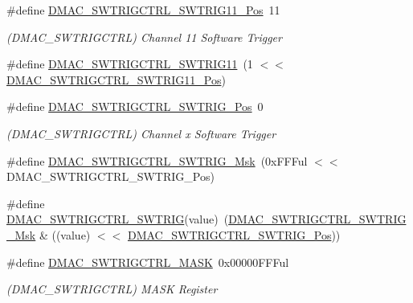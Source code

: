 \begin{DoxyCompactItemize}
\#define \mbox{\hyperlink{group___s_a_m_d21___d_m_a_c_gada09cd414a3038f1a8066b9f31145ed1}{D\+M\+A\+C\+\_\+\+S\+W\+T\+R\+I\+G\+C\+T\+R\+L\+\_\+\+S\+W\+T\+R\+I\+G11\+\_\+\+Pos}}~11
\begin{DoxyCompactList}\small\item\em (D\+M\+A\+C\+\_\+\+S\+W\+T\+R\+I\+G\+C\+T\+RL) Channel 11 Software Trigger \end{DoxyCompactList}\item 
\#define \mbox{\hyperlink{group___s_a_m_d21___d_m_a_c_ga94f459bfcef40f769ba47cbcdedc8da5}{D\+M\+A\+C\+\_\+\+S\+W\+T\+R\+I\+G\+C\+T\+R\+L\+\_\+\+S\+W\+T\+R\+I\+G11}}~(1 $<$$<$ \mbox{\hyperlink{group___s_a_m_d21___d_m_a_c_gada09cd414a3038f1a8066b9f31145ed1}{D\+M\+A\+C\+\_\+\+S\+W\+T\+R\+I\+G\+C\+T\+R\+L\+\_\+\+S\+W\+T\+R\+I\+G11\+\_\+\+Pos}})
\item 
\#define \mbox{\hyperlink{group___s_a_m_d21___d_m_a_c_gae62c65fde3a4d537e14c13d119192d8b}{D\+M\+A\+C\+\_\+\+S\+W\+T\+R\+I\+G\+C\+T\+R\+L\+\_\+\+S\+W\+T\+R\+I\+G\+\_\+\+Pos}}~0
\begin{DoxyCompactList}\small\item\em (D\+M\+A\+C\+\_\+\+S\+W\+T\+R\+I\+G\+C\+T\+RL) Channel x Software Trigger \end{DoxyCompactList}\item 
\#define \mbox{\hyperlink{group___s_a_m_d21___d_m_a_c_gae98a813d57394e89b56b86e480e29418}{D\+M\+A\+C\+\_\+\+S\+W\+T\+R\+I\+G\+C\+T\+R\+L\+\_\+\+S\+W\+T\+R\+I\+G\+\_\+\+Msk}}~(0x\+F\+F\+Ful $<$$<$ D\+M\+A\+C\+\_\+\+S\+W\+T\+R\+I\+G\+C\+T\+R\+L\+\_\+\+S\+W\+T\+R\+I\+G\+\_\+\+Pos)
\item 
\#define \mbox{\hyperlink{group___s_a_m_d21___d_m_a_c_ga3060f56266fbf1dfd13db1dd9ed9f3ce}{D\+M\+A\+C\+\_\+\+S\+W\+T\+R\+I\+G\+C\+T\+R\+L\+\_\+\+S\+W\+T\+R\+IG}}(value)~(\mbox{\hyperlink{group___s_a_m_d21___d_m_a_c_gae98a813d57394e89b56b86e480e29418}{D\+M\+A\+C\+\_\+\+S\+W\+T\+R\+I\+G\+C\+T\+R\+L\+\_\+\+S\+W\+T\+R\+I\+G\+\_\+\+Msk}} \& ((value) $<$$<$ \mbox{\hyperlink{group___s_a_m_d21___d_m_a_c_gae62c65fde3a4d537e14c13d119192d8b}{D\+M\+A\+C\+\_\+\+S\+W\+T\+R\+I\+G\+C\+T\+R\+L\+\_\+\+S\+W\+T\+R\+I\+G\+\_\+\+Pos}}))
\item 
\#define \mbox{\hyperlink{group___s_a_m_d21___d_m_a_c_ga0675eed53ab2c7d9f70d7d35b1bfb19a}{D\+M\+A\+C\+\_\+\+S\+W\+T\+R\+I\+G\+C\+T\+R\+L\+\_\+\+M\+A\+SK}}~0x00000\+F\+F\+Ful
\begin{DoxyCompactList}\small\item\em (D\+M\+A\+C\+\_\+\+S\+W\+T\+R\+I\+G\+C\+T\+RL) M\+A\+SK Register \end{DoxyCompactList}\item 
$$
\end{DoxyCompactItemize}
